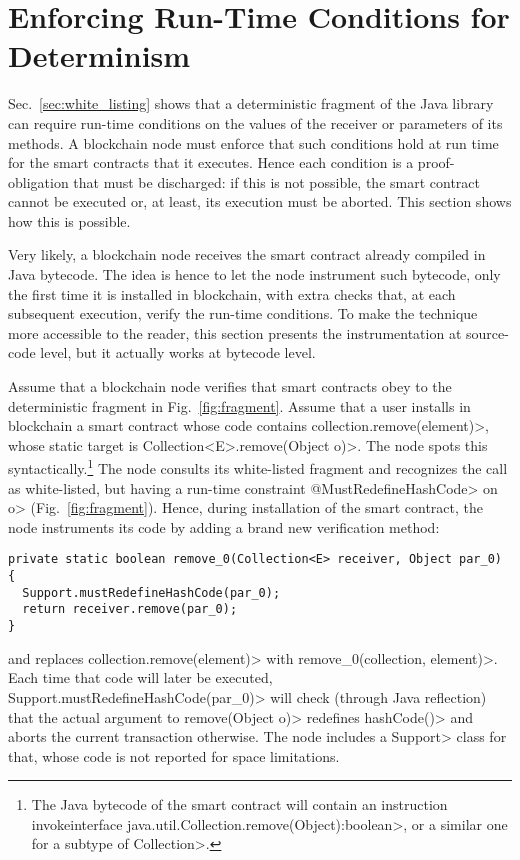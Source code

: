 \section{Enforcing Run-Time Conditions for Determinism}\label{sec:enforcing}

Sec.~\ref{sec:white_listing} shows that a deterministic fragment of the Java library
can require run-time conditions on the values of the receiver or
parameters of its methods. A blockchain node must enforce that such conditions hold
at run time for the smart contracts that it executes. Hence each condition
is a proof-obligation that must be discharged: if this is not possible, the smart contract
cannot be executed or, at least, its execution must be aborted. This section shows how
this is possible.

Very likely, a blockchain node receives the smart contract already compiled in Java bytecode.
The idea is hence to let the node instrument such bytecode, only the first time it is installed in blockchain,
with extra checks that, at each subsequent execution, verify the run-time conditions.
To make the technique more accessible to the reader, this section presents
the instrumentation at source-code level, but it actually works at bytecode level.

Assume that a blockchain node verifies that smart contracts obey to the deterministic
fragment in Fig.~\ref{fig:fragment}.
Assume that a user installs in blockchain a smart contract whose
code contains \<collection.remove(element)>, whose static target is
\<Collection$\text{<}$E$\text{>}$.remove(Object o)>.
The node spots this syntactically.\footnote{The Java bytecode of the
  smart contract will
  contain an instruction \<invokeinterface java.util.Collection.remove(Object):boolean>,
  or a similar one for a subtype of \<Collection>.}
The node consults its white-listed fragment and recognizes the call as
white-listed, but having a run-time constraint \<@MustRedefineHashCode> on \<o>
(Fig.~\ref{fig:fragment}). Hence, during installation of the
smart contract, the node instruments its code by adding a brand new
verification method:

{\small\begin{verbatim}
private static boolean remove_0(Collection<E> receiver, Object par_0) {
  Support.mustRedefineHashCode(par_0);
  return receiver.remove(par_0);
}
\end{verbatim}}

\noindent
and replaces \<collection.remove(element)> with \<remove\_0(collection, element)>.
Each time that code will later be executed,
\<Support.mustRedefineHashCode(par\_0)> will check (through Java reflection)
that the actual argument
to \<remove(Object o)> redefines \<hashCode()> and aborts
the current transaction otherwise. The node includes a
\<Support> class for that, whose
code is not reported for space limitations.

